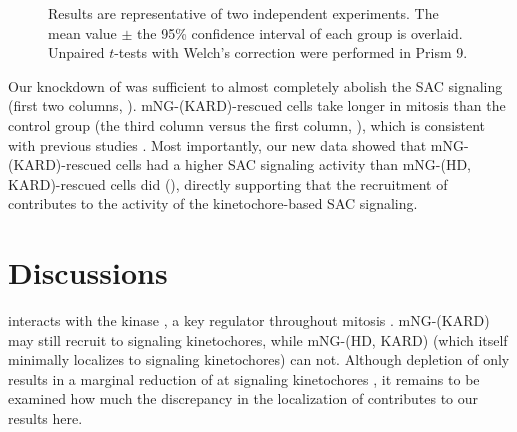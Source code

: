 \begin{figure} [t!]
Results are representative of two independent experiments. The mean value $\pm$ the 95\% confidence interval of each group is overlaid. Unpaired $t$-tests with Welch's correction were performed in Prism 9.
\end{figure}

Our knockdown of  was sufficient to almost completely abolish the SAC signaling (first two columns, ). mNG-(\textDelta{}KARD)-rescued cells take longer in mitosis than the control group (the third column versus the first column, ), which is consistent with previous studies \cite{PP2A-B56, BUBR1-L669A+I672A}. Most importantly, our new data showed that mNG-(\textDelta{}KARD)-rescued cells had a higher SAC signaling activity than mNG-(\textDelta{}HD, \textDelta{}KARD)-rescued cells did (), directly supporting that the recruitment of   contributes to the activity of the kinetochore-based SAC signaling.

\section{Discussions}
\label{Chapter3Discussions}


 interacts with the kinase , a key regulator throughout mitosis \cite{BUBR1-PLK1}. mNG-(\textDelta{}KARD) may still recruit  to signaling kinetochores, while mNG-(\textDelta{}HD, \textDelta{}KARD) (which itself minimally localizes to signaling kinetochores) can not. Although depletion of  only results in a marginal reduction of  at signaling kinetochores \cite{CENPU+BUB1-PLK1}, it remains to be examined how much the discrepancy in the localization of  contributes to our results here.


